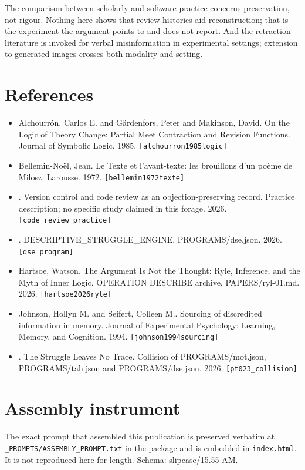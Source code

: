 \documentclass[11pt,a4paper]{article}
\begin{document}
The comparison between scholarly and software practice concerns preservation, not rigour. Nothing here shows that review histories aid reconstruction; that is the experiment the argument points to and does not report. And the retraction literature is invoked for verbal misinformation in experimental settings; extension to generated images crosses both modality and setting.

\section*{References}\small
\begin{itemize}\setlength\itemsep{0pt}
\item Alchourr{\'o}n, Carlos E. and G{\"a}rdenfors, Peter and Makinson, David. On the Logic of Theory Change: Partial Meet Contraction and Revision Functions. Journal of Symbolic Logic. 1985. \texttt{[alchourron1985logic]}
\item Bellemin-No{\"e}l, Jean. Le Texte et l'avant-texte: les brouillons d'un poème de Milosz. Larousse. 1972. \texttt{[bellemin1972texte]}
\item [author unrecorded]. Version control and code review as an objection-preserving record. Practice description; no specific study claimed in this forage. 2026. \texttt{[code\_review\_practice]}
\item [author unrecorded]. DESCRIPTIVE\_STRUGGLE\_ENGINE. PROGRAMS/dse.json. 2026. \texttt{[dse\_program]}
\item Hartsoe, Watson. The Argument Is Not the Thought: Ryle, Inference, and the Myth of Inner Logic. OPERATION DESCRIBE archive, PAPERS/ryl-01.md. 2026. \texttt{[hartsoe2026ryle]}
\item Johnson, Hollyn M. and Seifert, Colleen M.. Sourcing of discredited information in memory. Journal of Experimental Psychology: Learning, Memory, and Cognition. 1994. \texttt{[johnson1994sourcing]}
\item [author unrecorded]. The Struggle Leaves No Trace. Collision of PROGRAMS/mot.json, PROGRAMS/tah.json and PROGRAMS/dse.json. 2026. \texttt{[pt023\_collision]}
\end{itemize}\normalsize
\appendix
\section{Assembly instrument}
The exact prompt that assembled this publication is preserved verbatim at
\texttt{\_PROMPTS/ASSEMBLY\_PROMPT.txt} in the package and is embedded in \texttt{index.html}.
It is not reproduced here for length. Schema: slipcase/15.55-AM.
\end{document}

